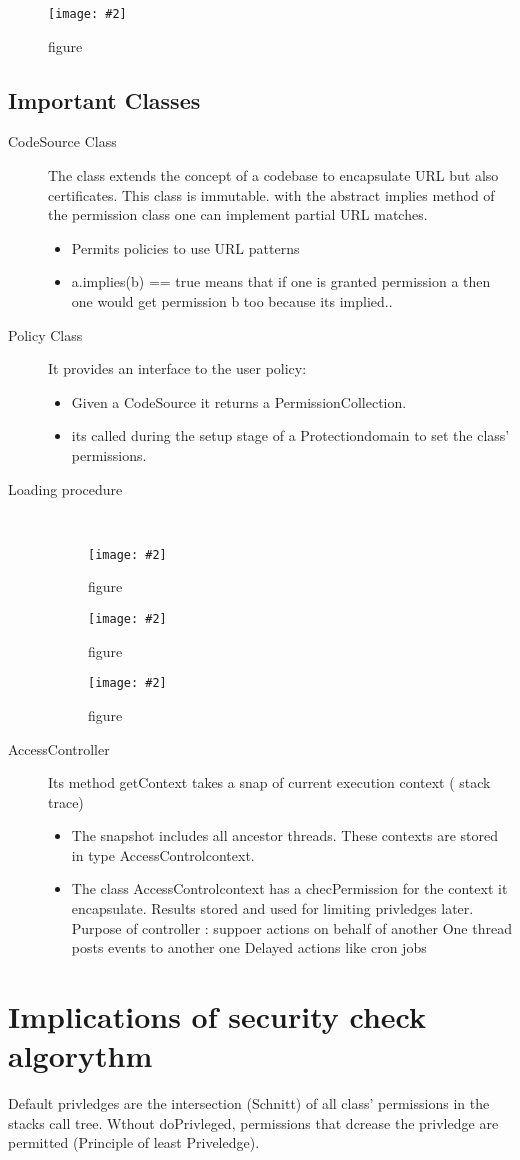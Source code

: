 \documentclass[a4paper,10pt]{scrreprt}
\newcommand{\pic}[2][figure]{\begin{figure}[h]
 \centering
 \texttt{[image: \#2]}
 \caption{#1}
\end{figure}
}
\begin{document}
\pic{pd.png}

\subsection{Important Classes}
\begin{description}

\item[CodeSource Class] The class extends the concept of a codebase to encapsulate URL but also certificates. This 
class is immutable.
with the abstract implies method of the permission class one can implement partial URL matches.
\begin{itemize}
 \item Permits policies to use URL patterns
 \item a.implies(b) == true means that if one is granted permission a then one would get permission b too because its 
implied..
\end{itemize}
 \item[Policy Class] It provides an interface to the user policy:
 \begin{itemize}
  \item Given a CodeSource it returns a PermissionCollection.
  \item its called during the setup stage of a Protectiondomain to set the class' permissions.
 \end{itemize}
\item[Loading procedure] \hfill \\
\pic{lp1.png}
\pic{lp2.png}
\pic{lp3.png}
\item[AccessController] Its method getContext takes a snap of current execution context ( stack trace)
\begin{itemize}
 \item The snapshot includes all ancestor threads. These contexts are stored in type AccessControlcontext.
 \item The class AccessControlcontext has a checPermission for the context it encapsulate. Results stored and used for 
limiting privledges later.
\subitem Purpose of controller : suppoer actions on behalf of another
\subitem One thread posts events to another one
\subitem Delayed actions like cron jobs
\end{itemize}

\end{description}
\pagebreak
\section{Implications of security check algorythm}
Default privledges are the intersection (Schnitt) of all class' permissions in the stacks call tree. Wthout 
doPrivleged, permissions that dcrease the privledge are permitted (Principle of least Priveledge).
\end{document}
